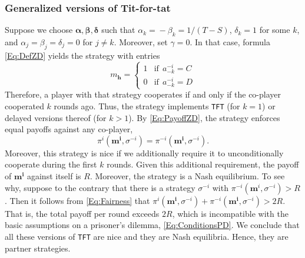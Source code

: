 \documentclass[9pt,twoside,lineno]{pnas-new}
\theoremstyle{plainCl1}
\theoremstyle{plainCl2}
\def\tft{\texttt{TFT}}
\begin{document}
\noindent
\subsubsection*{Generalized versions of Tit-for-tat} 
Suppose we choose $\boldsymbol \alpha, \boldsymbol \beta, \boldsymbol \delta$ such that $\alpha_k\!=\!-\beta_k\!=\!1/(T\!-\!S)$, $\delta_k\!=\!1$ for some $k$, and $\alpha_j\!=\!\beta_j\!=\!\delta_j\!=\!0$ for $j\!\neq\!k$. Moreover, set $\gamma\!=\!0$. In that case, formula
\eqref{Eq:DefZD} yields the strategy with entries
\begin{equation*}
m_\mathbf{h} = \left\{
\begin{array}{ll}
1	&\text{if}~~a^{-i}_{-k}=C\\[0.2cm]
0	&\text{if}~~a^{-i}_{-k}=D
\end{array}
\right.
\end{equation*}
Therefore, a player with that strategy cooperates if and only if the co-player cooperated $k$ rounds ago. 
Thus, the strategy implements \tft{} (for $k\!=\!1$) or delayed versions thereof (for $k\!>\!1$). 
By \eqref{Eq:PayoffZD}, the strategy enforces equal payoffs against any co-player, 
\begin{equation} \label{Eq:Fairness}
\pi^i(\mathbf{m^i},\sigma^{-i}) \!=\! \pi^{-i}(\mathbf{m^i},\sigma^{-i}).
\end{equation} 
Moreover, this strategy is nice if we additionally require it to unconditionally cooperate during the first $k$ rounds. 
Given this additional requirement, the payoff of $\mathbf{m^i}$ against itself is $R$. 
Moreover, the strategy is a Nash equilibrium. To see why, suppose to the contrary that there is a strategy $\sigma^{-i}$ with $\pi^{-i}(\mathbf{m}^i,\sigma^{-i}) \!>\! R$. Then it follows from \eqref{Eq:Fairness} that $\pi^i(\mathbf{m^i},\sigma^{-i}) \!+\! \pi^{-i}(\mathbf{m^i},\sigma^{-i})\!>\!2R$. That is, the total  payoff per round exceeds $2R$, which is incompatible with the basic assumptions on a prisoner's dilemma, \eqref{Eq:ConditionsPD}. We conclude that all these versions of \tft{} are nice and they are Nash equilibria. Hence, they are partner strategies.

\noindent
\end{document}
